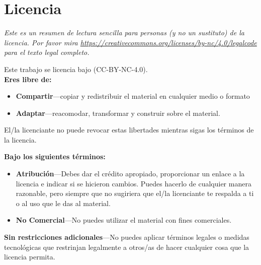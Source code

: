 \chapter{Licencia}\label{s:licencia}

{\setlength{\parindent}{0em}

\emph{
  Este es un resumen de lectura sencilla para personas (y no un sustituto) de la licencia.
  Por favor mira \url{https://creativecommons.org/licenses/by-nc/4.0/legalcode} para el texto legal completo.
}

\vspace{\baselineskip}

\noindent
Este trabajo se licencia bajo
(CC-BY-NC-4.0).\\

\noindent
\textbf{Eres libre de:}

\begin{itemize}
\item
  \textbf{Compartir}---copiar y redistribuir el material en cualquier medio o
  formato
\item
  \textbf{Adaptar}---reacomodar, transformar y construir sobre el material.
\end{itemize}

El/la licenciante no puede revocar estas libertades mientras sigas los
términos de la licencia.

\vspace{\baselineskip}

\textbf{Bajo los siguientes términos:}

\begin{itemize}
\item
  \textbf{Atribución}---Debes dar el crédito apropiado, proporcionar un enlace
  a la licencia e indicar si se hicieron cambios. Puedes hacerlo de cualquier manera
  razonable, pero siempre que no sugiriera que el/la licenciante te respalda 
  a ti o al uso que le das al material.\\
\item
  \textbf{No Comercial}---No puedes utilizar el material con fines comerciales.
\end{itemize}

\textbf{Sin restricciones adicionales}---No puedes aplicar términos legales o
medidas tecnológicas que restrinjan legalmente a otros/as de hacer cualquier cosa
que la licencia permita.

\vspace{\baselineskip}

}
